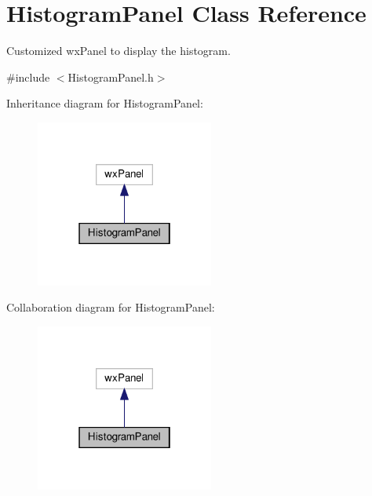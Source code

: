 \hypertarget{classHistogramPanel}{}\section{Histogram\+Panel Class Reference}
\label{classHistogramPanel}


Customized wx\+Panel to display the histogram.  




{\ttfamily \#include $<$Histogram\+Panel.\+h$>$}



Inheritance diagram for Histogram\+Panel\+:\nopagebreak
\begin{figure}[H]
\begin{center}
\leavevmode
\includegraphics[width=166pt]{classHistogramPanel__inherit__graph}
\end{center}
\end{figure}


Collaboration diagram for Histogram\+Panel\+:\nopagebreak
\begin{figure}[H]
\begin{center}
\leavevmode
\includegraphics[width=166pt]{classHistogramPanel__coll__graph}
\end{center}
\end{figure}
